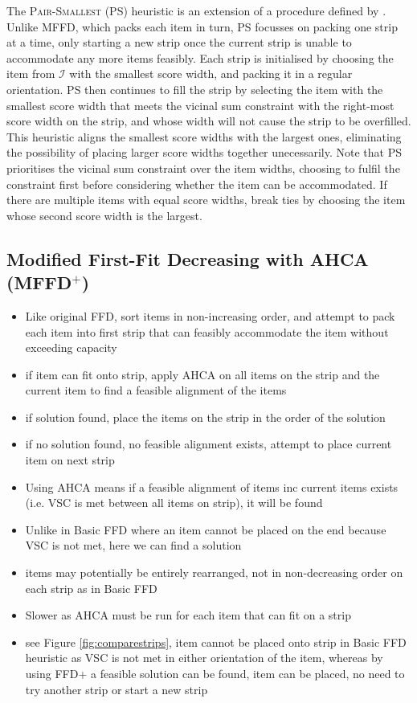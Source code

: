 \documentclass[oribibl]{llncs}
\begin{document}
The \textsc{Pair-Smallest} (PS) heuristic is an extension of a procedure defined by \cite{lewis2011}. Unlike MFFD, which packs each item in turn, PS focusses on packing one strip at a time, only starting a new strip once the current strip is unable to accommodate any more items feasibly. Each strip is initialised by choosing the item from $\mathcal{I}$ with the smallest score width, and packing it in a regular orientation. PS then continues to fill the strip by selecting the item with the smallest score width that meets the vicinal sum constraint with the right-most score width on the strip, and whose width will not cause the strip to be overfilled. This heuristic aligns the smallest score widths with the largest ones, eliminating the possibility of placing larger score widths together unecessarily. Note that PS prioritises the vicinal sum constraint over the item widths, choosing to fulfil the constraint first before considering whether the item can be accommodated. If there are multiple items with equal score widths, break ties by choosing the item whose second score width is the largest.


\subsection{Modified First-Fit Decreasing with AHCA (MFFD$^+$)}
\label{sec:mffd+}
\begin{itemize}
	\item Like original FFD, sort items in non-increasing order, and attempt to pack each item into first strip that can feasibly accommodate the item without exceeding capacity
	\item if item can fit onto strip, apply AHCA on all items on the strip and the current item to find a feasible alignment of the items
	\item if solution found, place the items on the strip in the order of the solution
	\item if no solution found, no feasible alignment exists, attempt to place current item on next strip
	\item Using AHCA means if a feasible alignment of items inc current items exists (i.e. VSC is met between all items on strip), it will be found
	\item Unlike in Basic FFD where an item cannot be placed on the end because VSC is not met, here we can find a solution
	\item items may potentially be entirely rearranged, not in non-decreasing order on each strip as in Basic FFD
	\item Slower as AHCA must be run for each item that can fit on a strip
	\item see Figure \ref{fig:comparestrips}, item cannot be placed onto strip in Basic FFD heuristic as VSC is not met in either orientation of the item, whereas by using FFD+ a feasible solution can be found, item can be placed, no need to try another strip or start a new strip
\end{itemize}
\end{document}
